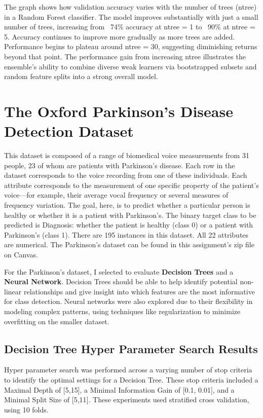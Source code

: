 \documentclass[letterpaper]{article}
\begin{document}
The graph shows how validation accuracy varies with the number of trees (ntree) in a Random Forest classifier. The model improves substantially with just a small number of trees, increasing from ~74\% accuracy at ntree = 1 to ~90\% at ntree = 5. Accuracy continues to improve more gradually as more trees are added. Performance begins to plateau around ntree = 30, suggesting diminishing returns beyond that point. The performance gain from increasing ntree illustrates the ensemble’s ability to combine diverse weak learners via bootstrapped subsets and random feature splits into a strong overall model.

\clearpage

\section{The Oxford Parkinson’s Disease Detection Dataset}
This dataset is composed of a range of biomedical voice measurements from 31 people, 23 of whom are patients with Parkinson’s disease. Each row in the dataset corresponds to the voice recording from one of these individuals. Each attribute corresponds to the measurement of one specific property of the patient’s voice—for example, their average vocal frequency or several measures of frequency variation. The goal, here, is to predict whether a particular person is healthy or whether it is a patient with Parkinson’s. The binary target class to be predicted is Diagnosis: whether the patient is healthy (class 0) or a patient with Parkinson’s (class 1). There are 195 instances in this dataset. All 22 attributes are numerical. The Parkinson’s dataset can be found in this assignment’s zip file on Canvas.

For the Parkinson’s dataset, I selected to evaluate \textbf{Decision Trees} and a \textbf{Neural Network}. Decision Trees should be able to help identify potential non-linear relationships and give insight into which features are the most informative for class detection. Neural networks were also explored due to their flexibility in modeling complex patterns, using techniques like regularization to minimize overfitting on the smaller dataset.

\subsection{Decision Tree Hyper Parameter Search Results}

    Hyper parameter search was performed across a varying number of stop criteria to identify the optimal settings for a Decision Tree. These stop criteria included a Maximal Depth of [5,15], a Minimal Information Gain of [0.1, 0.01], and a Minimal Split Size of [5,11].   
    These experiments used stratified cross validation, using 10 folds.
\end{document}
